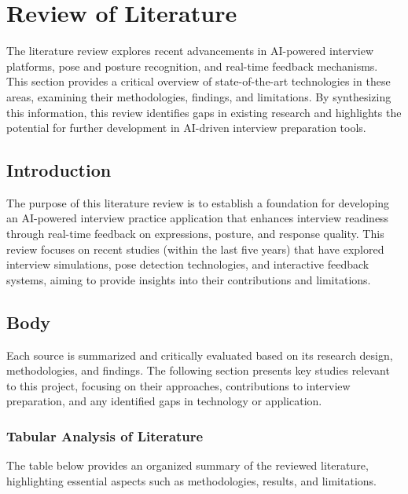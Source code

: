 \chapter{Review of Literature} \label{ch
}

The literature review explores recent advancements in AI-powered interview platforms, pose and posture recognition, and real-time feedback mechanisms. This section provides a critical overview of state-of-the-art technologies in these areas, examining their methodologies, findings, and limitations. By synthesizing this information, this review identifies gaps in existing research and highlights the potential for further development in AI-driven interview preparation tools.

\section{Introduction} The purpose of this literature review is to establish a foundation for developing an AI-powered interview practice application that enhances interview readiness through real-time feedback on expressions, posture, and response quality. This review focuses on recent studies (within the last five years) that have explored interview simulations, pose detection technologies, and interactive feedback systems, aiming to provide insights into their contributions and limitations.

\section{Body} Each source is summarized and critically evaluated based on its research design, methodologies, and findings. The following section presents key studies relevant to this project, focusing on their approaches, contributions to interview preparation, and any identified gaps in technology or application.

\subsection{Tabular Analysis of Literature} The table below provides an organized summary of the reviewed literature, highlighting essential aspects such as methodologies, results, and limitations.


